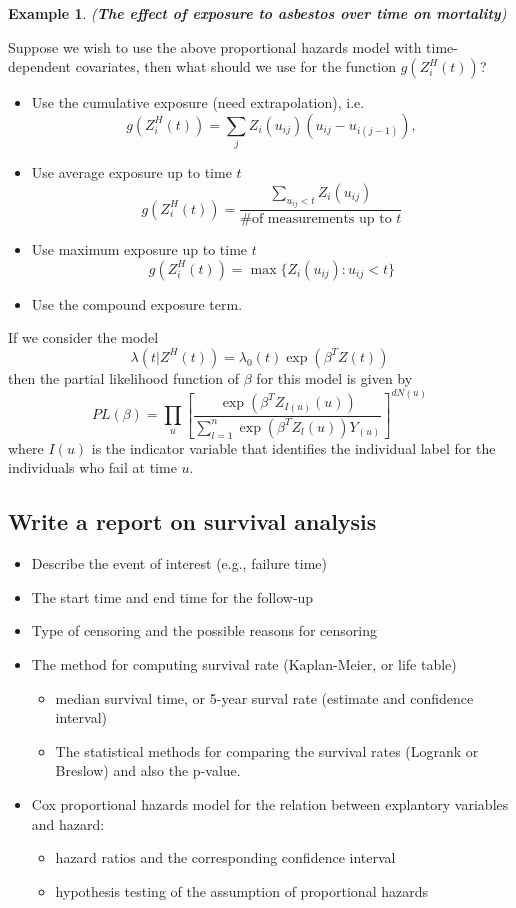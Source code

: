 \documentclass[11pt,addpoints,answers]{exam}
\newtheorem{example}{Example}
\begin{document}
\begin{CJK*}{UTF8}{gbsn}
\begin{example}{({\bf The effect of exposure to asbestos over time on mortality})}
\end{example}

Suppose we wish to use the above proportional hazards model with time-dependent covariates,
then what should we use for the function $g(Z_i^H(t))$?
\begin{itemize}
	\item Use the cumulative exposure (need extrapolation), i.e.
	$$
g(Z_i^H(t)) = \sum_j Z_i(u_{ij})(u_{ij} - u_{i(j-1)}),
	$$
	\item Use average exposure up to time $t$
	$$
g(Z_i^H(t)) = \frac{\sum_{u_{ij} < t}Z_i(u_{ij})}{\mbox{\# of measurements up to }t}
	$$
	\item Use maximum exposure up to time $t$
	$$
g(Z_i^H(t)) = \max\{Z_i(u_{ij}): u_{ij} < t\}
	$$
	\item Use the compound exposure term.
\end{itemize}

If we consider the model
$$
\lambda(t|Z^H(t)) = \lambda_0(t) \exp(\beta^T Z(t))
$$
then the partial likelihood function of $\beta$ for this model is given by
$$
PL(\beta) = \prod_u \left[ \frac{\exp(\beta^T Z_{I(u)}(u))}{\sum_{l=1}^n \exp(\beta^T Z_l(u))Y_(u)}\right]^{dN(u)}
$$
where $I(u)$ is the indicator variable that identifies the individual label for the 
individuals who fail at time $u$.




\subsection{Write a report on survival analysis}

\begin{itemize}
	\item Describe the event of interest (e.g., failure time)
	\item The start time and end time for the follow-up
	\item Type of censoring and the possible reasons for censoring
	\item The method for computing survival rate (Kaplan-Meier, or life table)
	\begin{itemize}
		\item median survival time, or 5-year surval rate (estimate and confidence interval)
		\item The statistical methods for comparing the survival rates (Logrank or Breslow) and 
			also the p-value.
	\end{itemize}
	\item Cox proportional hazards model for the relation between explantory variables and hazard:
	\begin{itemize}
		\item hazard ratios and the corresponding confidence interval
		\item hypothesis testing of the assumption of proportional hazards
	\end{itemize} 
\end{itemize}


\end{CJK*}
\end{document}
